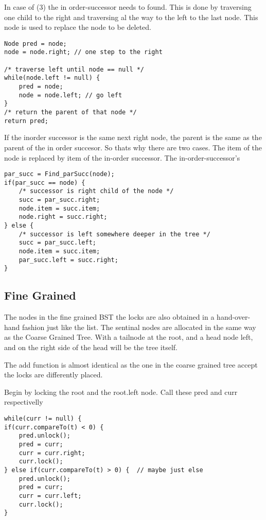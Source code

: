 \documentclass[10pt,a4paper]{article}
\begin{document}
In case of (3) the in order-successor needs to found. This is done by traversing one child to the right and traversing al the way to the left to the last node. This node is used to replace the node to be deleted.

\begin{lstlisting}
Node pred = node;
node = node.right; // one step to the right

/* traverse left until node == null */
while(node.left != null) {
    pred = node;
    node = node.left; // go left
}
/* return the parent of that node */
return pred;
\end{lstlisting}

If the inorder successor is the same next right node, the parent is the same as the parent of the in order succesor. So thats why there are two cases. The item of the node is replaced by item of the in-order successor. The in-order-successor's 
\begin{lstlisting}
par_succ = Find_parSucc(node);
if(par_succ == node) {
    /* successor is right child of the node */
    succ = par_succ.right;
    node.item = succ.item;
    node.right = succ.right;
} else {
    /* successor is left somewhere deeper in the tree */
    succ = par_succ.left;
    node.item = succ.item;
    par_succ.left = succ.right;
}
\end{lstlisting}


\subsection{Fine Grained}
The nodes in the fine grained BST the locks are also obtained in a hand-over-hand fashion just like the list. The sentinal nodes are allocated in the same way as the Coarse Grained Tree. With a tailnode at the root, and a head node left, and on the right side of the head will be the tree itself. 

The add function is almost identical as the one in the coarse grained tree accept the locks are differently placed.

Begin by locking the root and the root.left node. Call these pred and curr respectivelly

\begin{lstlisting}
while(curr != null) {
if(curr.compareTo(t) < 0) {
    pred.unlock();
    pred = curr;
    curr = curr.right;
    curr.lock();
} else if(curr.compareTo(t) > 0) {  // maybe just else
    pred.unlock();
    pred = curr;
    curr = curr.left;
    curr.lock();
}
\end{lstlisting}
\end{document}
